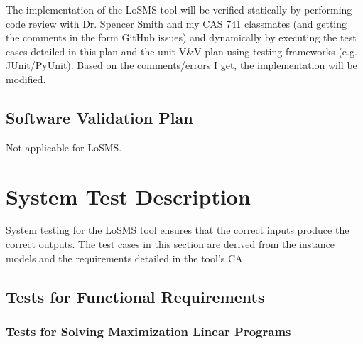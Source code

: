 \documentclass[12pt, titlepage]{article}
\newcommand{\famname}{LoSMS} %
\begin{document}
The implementation of the \famname{} tool will be verified statically by 
performing code review with Dr. Spencer Smith and my CAS 741 classmates (and 
getting the comments in the form GitHub issues) and dynamically by executing 
the test cases detailed in this plan and the unit V\&V plan using testing 
frameworks (e.g. JUnit/PyUnit). Based on the comments/errors I get, the 
implementation will be modified.
 
\subsection{Software Validation Plan}

Not applicable for \famname{}.

\section{System Test Description} \label{SystemTestDescription}

System testing for the \famname{} tool ensures that the correct inputs produce 
the correct outputs. The test cases in this section are derived from the 
instance models and the requirements detailed in the tool's CA.
	
\subsection{Tests for Functional Requirements}

\subsubsection{Tests for Solving Maximization Linear Programs}
\end{document}
